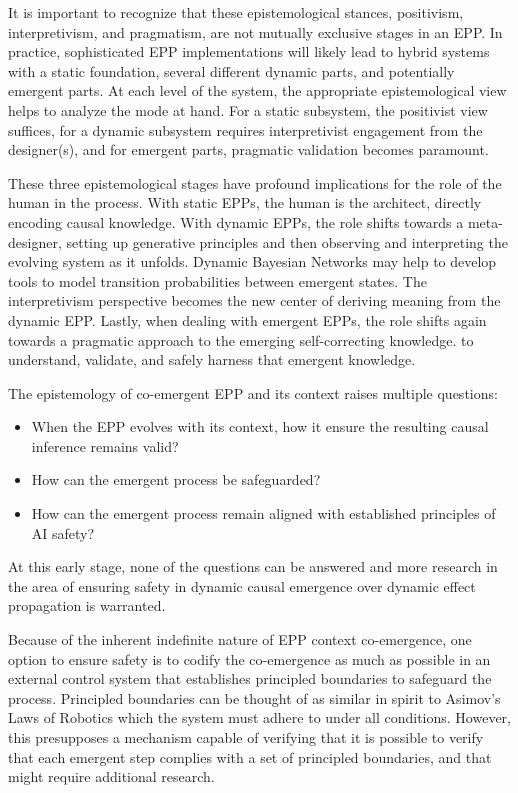 \documentclass{article}
\begin{document}
It is important to recognize that these epistemological stances, positivism, interpretivism, and pragmatism, are not mutually exclusive stages in an EPP. In practice, sophisticated EPP implementations will likely lead to hybrid systems with a static foundation, several different dynamic parts, and potentially emergent parts. At each level of the system, the appropriate epistemological view helps to analyze the mode at hand. For a static subsystem, the positivist view suffices, for a dynamic subsystem requires interpretivist engagement from the designer(s), and for emergent parts, pragmatic validation becomes paramount.

These three epistemological stages have profound implications for the role of the human in the process. With static EPPs, the human is the architect, directly encoding causal knowledge. With dynamic EPPs, the role shifts towards a meta-designer, setting up generative principles and then observing and interpreting the evolving system as it unfolds. Dynamic Bayesian Networks\cite{dagum1992dynamic} may help to develop tools to model transition probabilities between emergent states. The interpretivism perspective becomes the new center of deriving meaning from the dynamic EPP. Lastly, when dealing with emergent EPPs, the role shifts again towards a pragmatic approach to the emerging self-correcting knowledge. to understand, validate, and safely harness that emergent knowledge.

The epistemology of co-emergent EPP and its context raises multiple questions:

\begin{itemize}
    \item When the EPP evolves with its context, how it ensure the resulting causal inference remains valid?
    \item How can the emergent process be safeguarded?
    \item How can the emergent process remain aligned with established principles of AI safety?
\end{itemize}

At this early stage, none of the questions can be answered and more research in the area of ensuring safety in dynamic causal emergence over dynamic effect propagation is warranted.

Because of the inherent indefinite nature of EPP context co-emergence, one option to ensure safety is to codify the co-emergence as much as possible in an external control system that establishes principled boundaries to safeguard the process. Principled boundaries can be thought of as similar in spirit to Asimov's Laws of Robotics which the system must adhere to under all conditions. However, this presupposes a mechanism capable of verifying that it is possible to verify that each emergent step complies with a set of principled boundaries, and that might require additional research.
\end{document}
